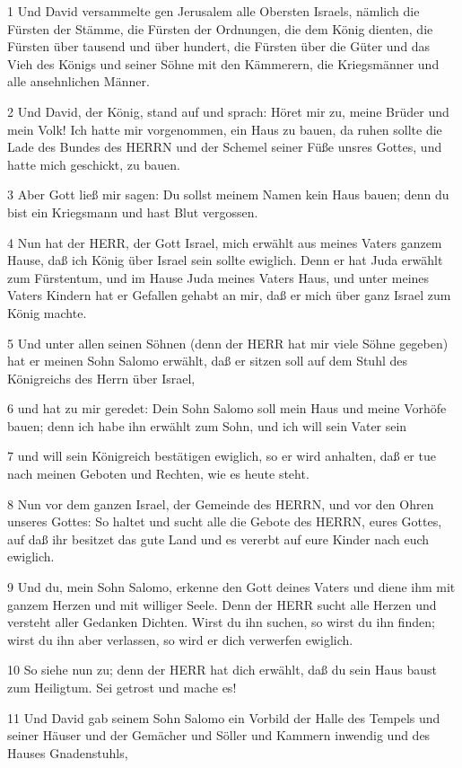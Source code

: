 \par 1 Und David versammelte gen Jerusalem alle Obersten Israels, nämlich die Fürsten der Stämme, die Fürsten der Ordnungen, die dem König dienten, die Fürsten über tausend und über hundert, die Fürsten über die Güter und das Vieh des Königs und seiner Söhne mit den Kämmerern, die Kriegsmänner und alle ansehnlichen Männer.
\par 2 Und David, der König, stand auf und sprach: Höret mir zu, meine Brüder und mein Volk! Ich hatte mir vorgenommen, ein Haus zu bauen, da ruhen sollte die Lade des Bundes des HERRN und der Schemel seiner Füße unsres Gottes, und hatte mich geschickt, zu bauen.
\par 3 Aber Gott ließ mir sagen: Du sollst meinem Namen kein Haus bauen; denn du bist ein Kriegsmann und hast Blut vergossen.
\par 4 Nun hat der HERR, der Gott Israel, mich erwählt aus meines Vaters ganzem Hause, daß ich König über Israel sein sollte ewiglich. Denn er hat Juda erwählt zum Fürstentum, und im Hause Juda meines Vaters Haus, und unter meines Vaters Kindern hat er Gefallen gehabt an mir, daß er mich über ganz Israel zum König machte.
\par 5 Und unter allen seinen Söhnen (denn der HERR hat mir viele Söhne gegeben) hat er meinen Sohn Salomo erwählt, daß er sitzen soll auf dem Stuhl des Königreichs des Herrn über Israel,
\par 6 und hat zu mir geredet: Dein Sohn Salomo soll mein Haus und meine Vorhöfe bauen; denn ich habe ihn erwählt zum Sohn, und ich will sein Vater sein
\par 7 und will sein Königreich bestätigen ewiglich, so er wird anhalten, daß er tue nach meinen Geboten und Rechten, wie es heute steht.
\par 8 Nun vor dem ganzen Israel, der Gemeinde des HERRN, und vor den Ohren unseres Gottes: So haltet und sucht alle die Gebote des HERRN, eures Gottes, auf daß ihr besitzet das gute Land und es vererbt auf eure Kinder nach euch ewiglich.
\par 9 Und du, mein Sohn Salomo, erkenne den Gott deines Vaters und diene ihm mit ganzem Herzen und mit williger Seele. Denn der HERR sucht alle Herzen und versteht aller Gedanken Dichten. Wirst du ihn suchen, so wirst du ihn finden; wirst du ihn aber verlassen, so wird er dich verwerfen ewiglich.
\par 10 So siehe nun zu; denn der HERR hat dich erwählt, daß du sein Haus baust zum Heiligtum. Sei getrost und mache es!
\par 11 Und David gab seinem Sohn Salomo ein Vorbild der Halle des Tempels und seiner Häuser und der Gemächer und Söller und Kammern inwendig und des Hauses Gnadenstuhls,
